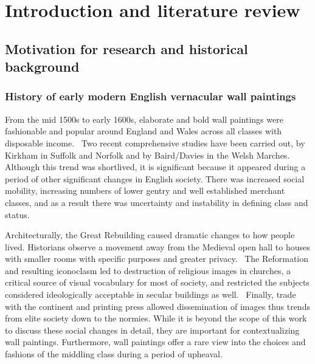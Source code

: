 

\chapter{Introduction and literature review}


\ifpdf
    \graphicspath{{Chapter1/Figs/Raster/}{Chapter1/Figs/PDF/}{Chapter1/Figs/}}
\else
    \graphicspath{{Chapter1/Figs/Vector/}{Chapter1/Figs/}}
\fi



\section[Motivation for research and historical background]{Motivation for research and historical background}
\label{section1.1}

\subsection[History of early modern English wall paintings]{History of early modern English vernacular wall paintings}
\label{subsection1.1.1}

From the mid 1500s to early 1600s, elaborate and bold wall paintings were fashionable and popular around England and Wales across all classes with disposable income.~\autocite{Baird_thesis,Davies_book,Kirkham_thesis} Two recent comprehensive studies have been carried out, by Kirkham in Suffolk and Norfolk and by Baird/Davies in the Welsh Marches. Although this trend was shortlived, it is significant because it appeared during a period of other significant changes in English society. There was increased social mobility, increasing numbers of lower gentry and well established merchant classes, and as a result there was uncertainty and instability in defining class and status.~\autocite{Baird_thesis} 

Architecturally, the Great Rebuilding caused dramatic changes to how people lived. Historians observe a movement away from the Medieval open hall to houses with smaller rooms with specific purposes and greater privacy.~\autocite{Baird_thesis,Davies_book,Hamling_book} The Reformation and resulting iconoclasm led to destruction of religious images in churches, a critical source of visual vocabulary for most of society, and restricted the subjects considered ideologically acceptable in secular buildings as well.~\autocite{Kirkham_thesis,Hamling_book,Giles} Finally, trade with the continent and printing press allowed dissemination of images thus trends from elite society down to the normies. While it is beyond the scope of this work to discuss these social changes in detail, they are important for contextualizing wall paintings. Furthermore, wall paintings offer a rare view into the choices and fashions of the middling class during a period of upheaval.~\autocite{Kirkham_thesis,Baird_thesis}

